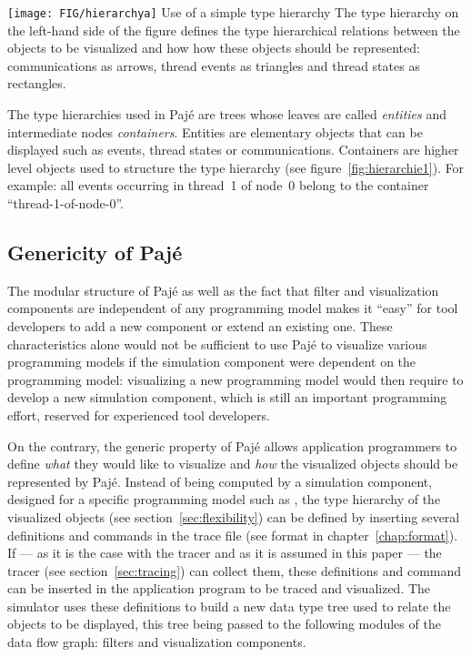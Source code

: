  {\texttt{[image: FIG/hierarchya]}} {Use of a
  simple type hierarchy} {The type hierarchy on the left-hand side of
  the figure defines the type hierarchical relations between the
  objects to be visualized and how how these objects should be
  represented: communications as arrows, thread events as triangles
  and thread states as rectangles.}
  
The type hierarchies used in Pajé are trees whose leaves are called
\textit{entities} and intermediate nodes
\textit{containers}. Entities are elementary objects
that can be displayed such as events, thread states or communications.
Containers are higher level objects used to structure the type
hierarchy (see figure~\ref{fig:hierarchie1}).
For example: all events occurring in thread~1 of node~0 belong to the
container ``thread-1-of-node-0''.


\subsection{Genericity of Pajé}
\label{sec:genericity}

The modular structure of Pajé as well as the fact that filter and
visualization components are independent of any programming model
makes it ``easy'' for tool developers to add a new component or extend
an existing one. These characteristics alone would not be sufficient
to use Pajé to visualize various programming models if the simulation
component were dependent on the programming model: visualizing a new
programming model would then require to develop a new simulation
component, which is still an important programming effort, reserved
for experienced tool developers.

On the contrary, the generic property of Pajé allows application
programmers to define \textit{what} they would like to visualize and
\textit{how} the visualized objects should be represented by Pajé.
Instead of being computed by a simulation component, designed for a
specific programming model such as \ath, the type hierarchy of the
visualized objects (see section~\ref{sec:flexibility}) can be defined
by inserting several definitions and commands in the trace file (see
format in chapter~\ref{chap:format}). If --- as it is the case with
the  tracer and as it is assumed in this paper --- the tracer
(see section~\ref{sec:tracing}) can collect them, these definitions
and command can be inserted in the application program to be traced
and visualized.  The simulator uses these definitions to build a new
data type tree used to relate the objects to be displayed, this tree
being passed to the following modules of the data flow graph: filters
and visualization components.

